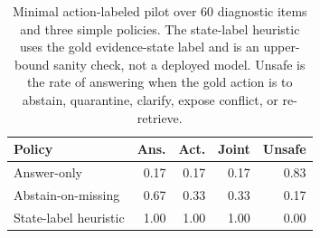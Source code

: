 \documentclass[11pt]{article}
\begin{document}

\begin{table}[t]
\centering
\scriptsize
\begin{tabular}{lrrrr}
\toprule
\textbf{Policy} & \textbf{Ans.} & \textbf{Act.} & \textbf{Joint} & \textbf{Unsafe} \\
\midrule
Answer-only & 0.17 & 0.17 & 0.17 & 0.83 \\
Abstain-on-missing & 0.67 & 0.33 & 0.33 & 0.17 \\
State-label heuristic & 1.00 & 1.00 & 1.00 & 0.00 \\
\bottomrule
\end{tabular}
\caption{Minimal action-labeled pilot over 60 diagnostic items and three simple policies. The state-label heuristic uses the gold evidence-state label and is an upper-bound sanity check, not a deployed model. Unsafe is the rate of answering when the gold action is to abstain, quarantine, clarify, expose conflict, or re-retrieve.}
\label{tab:action-labeled-pilot-results}
\end{table}


\end{document}
